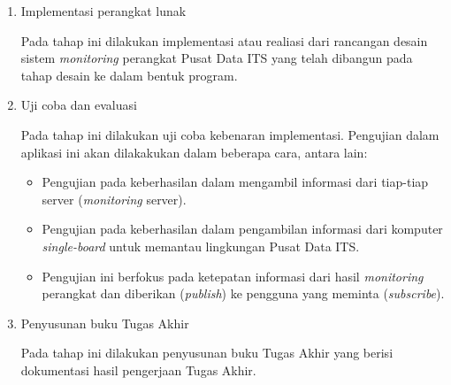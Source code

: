 \begin{enumerate}
	\item Implementasi perangkat lunak
	
	\tab Pada tahap ini dilakukan implementasi atau realiasi dari rancangan desain sistem \textit{monitoring} perangkat Pusat Data ITS yang telah dibangun pada tahap desain ke dalam bentuk program.
	
	\item Uji coba dan evaluasi
	
	\tab Pada tahap ini dilakukan uji coba kebenaran implementasi. Pengujian dalam aplikasi ini akan dilakakukan dalam beberapa cara, antara lain:
	\begin{itemize}
		\item Pengujian pada keberhasilan dalam mengambil informasi dari tiap-tiap server (\textit{monitoring} server).
		\item Pengujian pada keberhasilan dalam pengambilan informasi dari komputer \textit{single-board} untuk memantau lingkungan Pusat Data ITS.
		\item Pengujian ini berfokus pada ketepatan informasi dari hasil \textit{monitoring} perangkat dan diberikan (\textit{publish}) ke pengguna yang meminta (\textit{subscribe}).
	\end{itemize}
	
	\item Penyusunan buku Tugas Akhir
	
	Pada tahap ini dilakukan penyusunan buku Tugas Akhir yang berisi dokumentasi hasil pengerjaan Tugas Akhir.
\end{enumerate}

